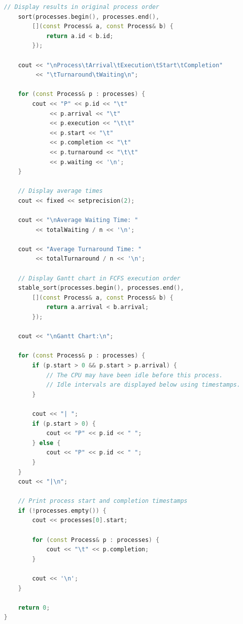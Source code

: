 \documentclass[10pt,a4paper]{article}
\begin{document}
\begin{lstlisting}[language=C++]
    // Display results in original process order
    sort(processes.begin(), processes.end(),
        [](const Process& a, const Process& b) {
            return a.id < b.id;
        });

    cout << "\nProcess\tArrival\tExecution\tStart\tCompletion"
         << "\tTurnaround\tWaiting\n";

    for (const Process& p : processes) {
        cout << "P" << p.id << "\t"
             << p.arrival << "\t"
             << p.execution << "\t\t"
             << p.start << "\t"
             << p.completion << "\t"
             << p.turnaround << "\t\t"
             << p.waiting << '\n';
    }

    // Display average times
    cout << fixed << setprecision(2);

    cout << "\nAverage Waiting Time: "
         << totalWaiting / n << '\n';

    cout << "Average Turnaround Time: "
         << totalTurnaround / n << '\n';

    // Display Gantt chart in FCFS execution order
    stable_sort(processes.begin(), processes.end(),
        [](const Process& a, const Process& b) {
            return a.arrival < b.arrival;
        });

    cout << "\nGantt Chart:\n";

    for (const Process& p : processes) {
        if (p.start > 0 && p.start > p.arrival) {
            // The CPU may have been idle before this process.
            // Idle intervals are displayed below using timestamps.
        }

        cout << "| ";
        if (p.start > 0) {
            cout << "P" << p.id << " ";
        } else {
            cout << "P" << p.id << " ";
        }
    }
    cout << "|\n";

    // Print process start and completion timestamps
    if (!processes.empty()) {
        cout << processes[0].start;

        for (const Process& p : processes) {
            cout << "\t" << p.completion;
        }

        cout << '\n';
    }

    return 0;
}
\end{lstlisting}
\end{document}
